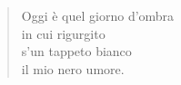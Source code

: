 
\begin{verse}
    Oggi è quel giorno d'ombra\\
    in cui rigurgito\\
    s'un tappeto bianco\\
    il mio nero umore.
\end{verse}